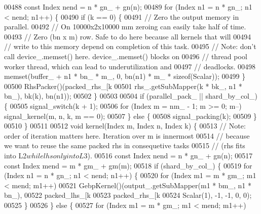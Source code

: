 \begin{DoxyCode}
00488       \textcolor{keyword}{const} Index nend = n * gn\_ + gn(n);
00489       \textcolor{keywordflow}{for} (Index n1 = n * gn\_; n1 < nend; n1++) \{
00490         \textcolor{keywordflow}{if} (k == 0) \{
00491           \textcolor{comment}{// Zero the output memory in parallel.}
00492           \textcolor{comment}{// On 10000x2x10000 mm zeroing can easily take half of time.}
00493           \textcolor{comment}{// Zero (bn x m) row. Safe to do here because all kernels that will}
00494           \textcolor{comment}{// write to this memory depend on completion of this task.}
00495           \textcolor{comment}{// Note: don't call device\_.memset() here. device\_.memset() blocks on}
00496           \textcolor{comment}{// thread pool worker thread, which can lead to underutilization and}
00497           \textcolor{comment}{// deadlocks.}
00498           memset(buffer\_ + n1 * bn\_ * m\_, 0, bn(n1) * m\_ * \textcolor{keyword}{sizeof}(Scalar));
00499         \}
00500         RhsPacker()(packed\_rhs\_[k %
00501                     rhs\_.getSubMapper(k * bk\_, n1 * bn\_), bk(k), bn(n1));
00502       \}
00503 
00504       \textcolor{keywordflow}{if} (parallel\_pack\_ || shard\_by\_col\_) \{
00505         signal\_switch(k + 1);
00506         \textcolor{keywordflow}{for} (Index m = nm\_ - 1; m >= 0; m--) signal\_kernel(m, n, k, m == 0);
00507       \} \textcolor{keywordflow}{else} \{
00508         signal\_packing(k);
00509       \}
00510     \}
00511 
00512     \textcolor{keywordtype}{void} kernel(Index m, Index n, Index k) \{
00513       \textcolor{comment}{// Note: order of iteration matters here. Iteration over m is innermost}
00514       \textcolor{comment}{// because we want to reuse the same packed rhs in consequetive tasks}
00515       \textcolor{comment}{// (rhs fits into L2$ while lhs only into L3$).}
00516       \textcolor{keyword}{const} Index nend = n * gn\_ + gn(n);
00517       \textcolor{keyword}{const} Index mend = m * gm\_ + gm(m);
00518       \textcolor{keywordflow}{if} (shard\_by\_col\_) \{
00519         \textcolor{keywordflow}{for} (Index n1 = n * gn\_; n1 < nend; n1++) \{
00520           \textcolor{keywordflow}{for} (Index m1 = m * gm\_; m1 < mend; m1++)
00521             GebpKernel()(output\_.getSubMapper(m1 * bm\_, n1 * bn\_),
00522                          packed\_lhs\_[k %
00523                          packed\_rhs\_[k %
00524                          Scalar(1), -1, -1, 0, 0);
00525         \}
00526       \} \textcolor{keywordflow}{else} \{
00527         \textcolor{keywordflow}{for} (Index m1 = m * gm\_; m1 < mend; m1++)

\end{DoxyCode}
